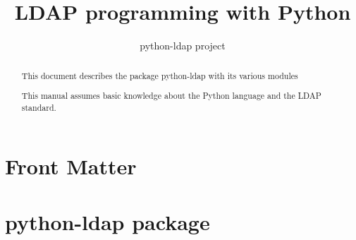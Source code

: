 \documentclass{manual}
\title{LDAP programming with Python}
\author{python-ldap project}
\begin{document}
\maketitle

\ifhtml
\chapter*{Front Matter\label{front}}
\fi

\begin{abstract}
\noindent
This document describes the package python-ldap with its various modules

This manual assumes basic knowledge about the Python language and the
LDAP standard.
\end{abstract}

\tableofcontents

\chapter{python-ldap package}












\renewcommand{\indexname}{Module Index}

\renewcommand{\indexname}{Index}
\end{document}
